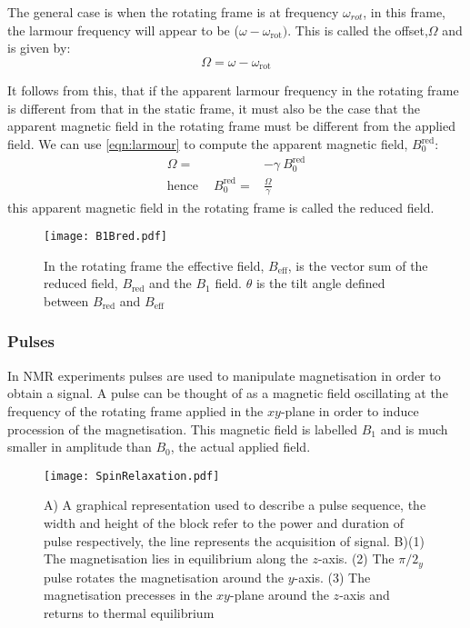 The general case is when the rotating frame is at frequency $\omega_{rot}$, in this
frame, the larmour frequency will appear to be ($\omega - \omega_{\text{rot}})$. This is called the offset,$\Omega$ and is given by:
\begin{equation}
  \Omega = \omega -\omega_{\text{rot}}
\end{equation}

It follows from this, that if the apparent larmour frequency in the rotating frame is different from that in the static frame, it must also be the case that the apparent magnetic field in the rotating frame must be different from the applied
field. We can use \ref{eqn:larmour} to compute the apparent magnetic field, $B^{\text{red}}_0$:
\begin{align}\label{eqn:redB}
  \Omega =& -\gamma~B^{\text{red}}_0\\
\text{hence}\quad~B^{\text{red}}_0 =& \frac{\Omega}{\gamma}
\end{align}
this apparent magnetic field in the rotating frame is called the reduced field.

\begin{figure}
  \begin{center}
  \texttt{[image: B1Bred.pdf]}
  \end{center}
  \caption{In the rotating frame the effective field, $B_{\text{eff}}$, is the vector sum of the reduced field,
  $B_{\text{red}}$ and the $B_1$ field. $\theta$ is the tilt angle defined between $B_{\text{red}}$ and $B_{\text{eff}}$}
  \label{fig:BMag}
\end{figure}


\subsubsection{Pulses}

In NMR experiments pulses are used to manipulate magnetisation in order to obtain a signal. A pulse can be
thought of as a magnetic field oscillating at the frequency of the rotating frame
applied in the $xy$-plane in order to induce procession of the magnetisation. This magnetic field is labelled $B_1$ and is much smaller in amplitude than $B_0$, the actual applied field.

\begin{figure}
  \begin{center}
  \texttt{[image: SpinRelaxation.pdf]}
  \end{center}
  \caption{A) A graphical representation used to describe a pulse sequence, the width and height of the block
  refer to the power and duration of pulse respectively, the line represents the acquisition of signal. B)(1) The
  magnetisation lies in equilibrium along the $z$-axis. (2)  The $\pi/2_y$ pulse rotates the magnetisation around the $y$-axis. (3) The magnetisation precesses in the $xy$-plane around the $z$-axis and returns to thermal equilibrium}
  \label{fig:Pulse}
\end{figure}

